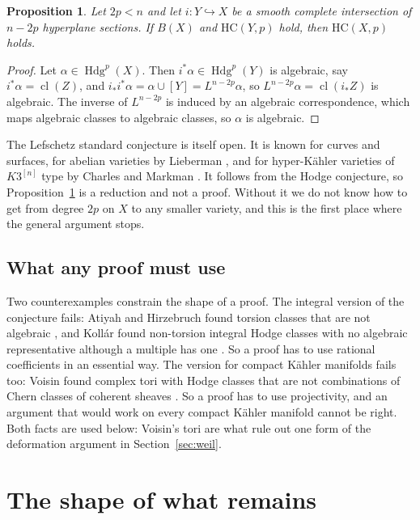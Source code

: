 \documentclass[11pt]{amsart}
\newtheorem{proposition}[theorem]{Proposition}
\theoremstyle{definition}
\theoremstyle{remark}
\newcommand{\Hdg}{\operatorname{Hdg}}
\newcommand{\cl}{\operatorname{cl}}
\newcommand{\HC}{\mathrm{HC}}
\begin{document}
\begin{proposition}\label{prop:middle}
Let $2p<n$ and let $i\colon Y\hookrightarrow X$ be a smooth complete
intersection of $n-2p$ hyperplane sections. If $B(X)$ and $\HC(Y,p)$ hold,
then $\HC(X,p)$ holds.
\end{proposition}

\begin{proof}
Let $\alpha\in\Hdg^{p}(X)$. Then $i^{*}\alpha\in\Hdg^{p}(Y)$ is algebraic, say
$i^{*}\alpha=\cl(Z)$, and $i_{*}i^{*}\alpha=\alpha\cup[Y]=L^{n-2p}\alpha$, so
$L^{n-2p}\alpha=\cl(i_{*}Z)$ is algebraic. The inverse of $L^{n-2p}$ is
induced by an algebraic correspondence, which maps algebraic classes to
algebraic classes, so $\alpha$ is algebraic.
\end{proof}

The Lefschetz standard conjecture is itself open. It is known for curves and
surfaces, for abelian varieties by Lieberman \cite{Lie68,Kle68}, and for
hyper-K\"ahler varieties of $K3^{[n]}$ type by Charles and Markman
\cite{CM13}. It follows from the Hodge conjecture, so
Proposition~\ref{prop:middle} is a reduction and not a proof. Without it we
do not know how to get from degree $2p$ on $X$ to any smaller variety, and
this is the first place where the general argument stops.

\subsection{What any proof must use}

Two counterexamples constrain the shape of a proof. The integral version of
the conjecture fails: Atiyah and Hirzebruch found torsion classes that are
not algebraic \cite{AH62}, and Koll\'ar found non-torsion integral Hodge
classes with no algebraic representative although a multiple has one
\cite{Kol92}. So a proof has to use rational coefficients in an essential
way. The version for compact K\"ahler manifolds fails too: Voisin found
complex tori with Hodge classes that are not combinations of Chern classes of
coherent sheaves \cite{Voi02b}. So a proof has to use projectivity, and an
argument that would work on every compact K\"ahler manifold cannot be right.
Both facts are used below: Voisin's tori are what rule out one form of the
deformation argument in Section~\ref{sec:weil}.

\section{The shape of what remains}\label{sec:shape}
\end{document}
